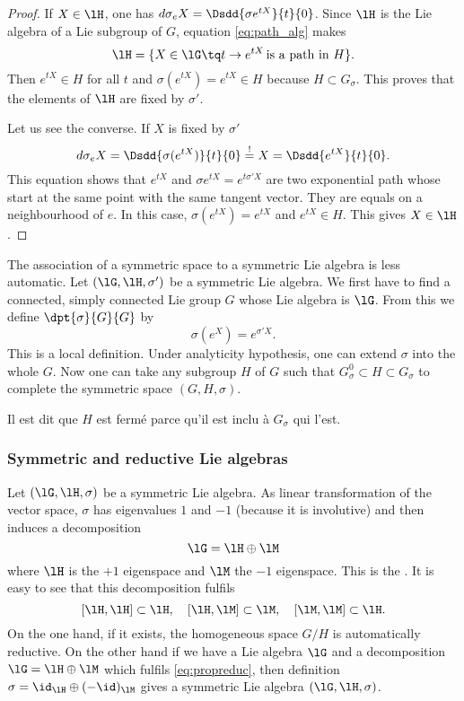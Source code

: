 \begin{proof}
If $X\in \lH$, one has $d\sigma_eX=\Dsdd{\sigma e^{tX}}{t}{0}$. Since $\lH$ is the Lie algebra of a Lie subgroup of $G$, equation \eqref{eq:path_alg} makes
\[
  \lH=\{X\in\lG\tq t\to e^{tX}\,\text{is a path in }H\}.
\]
Then $e^{tX}\in H$ for all $t$ and $\sigma(e^{tX})=e^{tX}\in H$ because $H\subset G_{\sigma}$. This proves that the elements of $\lH$ are fixed by $\sigma'$.

Let us see the converse. If $X$ is fixed by $\sigma'$
\[
  d\sigma_eX=\Dsdd{\sigma(e^{tX})}{t}{0}\stackrel{!}{=}X=\Dsdd{e^{tX}}{t}{0}.
\]
This equation shows that $e^{tX}$ and $\sigma e^{tX}=e^{t\sigma' X}$ are two exponential path whose start at the same point with the same tangent vector. They are equals on a neighbourhood of $e$. In this case, $\sigma(e^{tX})=e^{tX}$ and $e^{tX}\in H$. This gives $X\in \lH$.

\end{proof}

The association of a symmetric space to a symmetric Lie algebra is less automatic. Let $(\lG,\lH,\sigma')$ be a symmetric Lie algebra. We first have to find a connected, simply connected Lie group $G$ whose Lie algebra is $\lG$. From this we define $\dpt{\sigma}{G}{G}$ by
\[
  \sigma(e^X)=e^{\sigma'X}.
\]
This is a local definition. Under analyticity hypothesis, one can extend $\sigma$ into the whole $G$. Now one can take any subgroup $H$ of $G$ such that $G_{\sigma}^0\subset H\subset G_{\sigma}$ to complete the symmetric space $(G,H,\sigma)$.

\begin{probleme}
Il est dit que $H$ est ferm\'e parce qu'il est inclu \`a $G_{\sigma}$ qui l'est.
\end{probleme}

\subsubsection{Symmetric and reductive Lie algebras}

Let $(\lG,\lH,\sigma)$ be a symmetric Lie algebra. As linear transformation of the vector space, $\sigma$ has eigenvalues $1$ and $-1$ (because it is involutive) and then induces a decomposition
\begin{equation}
\lG=\lH\oplus\lM
\end{equation}
where $\lH$ is the $+1$ eigenspace and $\lM$ the $-1$ eigenspace. This is the . It is easy to see that this decomposition fulfils
\begin{equation}  \label{eq:propreduc}
[\lH,\lH]\subset\lH,\quad[\lH,\lM]\subset\lM,\quad[\lM,\lM]\subset\lH.
\end{equation}
On the one hand, if it exists, the homogeneous space $G/H$ is automatically reductive. On the other hand if we have a Lie algebra $\lG$ and a decomposition $\lG=\lH\oplus\lM$ which fulfils \eqref{eq:propreduc}, then definition $\sigma=\id_{\lH}\oplus(-\id)_{\lM}$ gives a symmetric Lie algebra $(\lG,\lH,\sigma)$.

